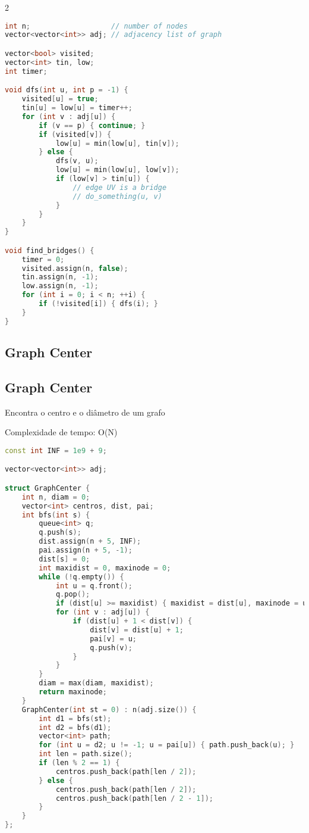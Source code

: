 \documentclass[11pt, a4paper, twoside]{article}
\begin{document}
\begin{multicols}{2}
\begin{lstlisting}[language=C++]
int n;                   // number of nodes
vector<vector<int>> adj; // adjacency list of graph

vector<bool> visited;
vector<int> tin, low;
int timer;

void dfs(int u, int p = -1) {
    visited[u] = true;
    tin[u] = low[u] = timer++;
    for (int v : adj[u]) {
        if (v == p) { continue; }
        if (visited[v]) {
            low[u] = min(low[u], tin[v]);
        } else {
            dfs(v, u);
            low[u] = min(low[u], low[v]);
            if (low[v] > tin[u]) {
                // edge UV is a bridge
                // do_something(u, v)
            }
        }
    }
}

void find_bridges() {
    timer = 0;
    visited.assign(n, false);
    tin.assign(n, -1);
    low.assign(n, -1);
    for (int i = 0; i < n; ++i) {
        if (!visited[i]) { dfs(i); }
    }
}
\end{lstlisting}
\end{multicols}

\subsection{Graph Center}

\subsection{Graph Center}


Encontra o centro e o diâmetro de um grafo

Complexidade de tempo: O(N)

\begin{lstlisting}[language=C++]
const int INF = 1e9 + 9;

vector<vector<int>> adj;

struct GraphCenter {
    int n, diam = 0;
    vector<int> centros, dist, pai;
    int bfs(int s) {
        queue<int> q;
        q.push(s);
        dist.assign(n + 5, INF);
        pai.assign(n + 5, -1);
        dist[s] = 0;
        int maxidist = 0, maxinode = 0;
        while (!q.empty()) {
            int u = q.front();
            q.pop();
            if (dist[u] >= maxidist) { maxidist = dist[u], maxinode = u; }
            for (int v : adj[u]) {
                if (dist[u] + 1 < dist[v]) {
                    dist[v] = dist[u] + 1;
                    pai[v] = u;
                    q.push(v);
                }
            }
        }
        diam = max(diam, maxidist);
        return maxinode;
    }
    GraphCenter(int st = 0) : n(adj.size()) {
        int d1 = bfs(st);
        int d2 = bfs(d1);
        vector<int> path;
        for (int u = d2; u != -1; u = pai[u]) { path.push_back(u); }
        int len = path.size();
        if (len % 2 == 1) {
            centros.push_back(path[len / 2]);
        } else {
            centros.push_back(path[len / 2]);
            centros.push_back(path[len / 2 - 1]);
        }
    }
};
\end{lstlisting}
\end{document}
